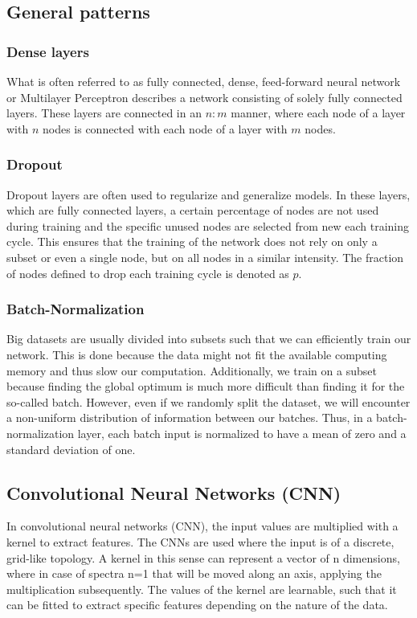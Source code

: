 \subsection{General patterns}


\subsubsection{Dense layers}
What is often referred to as fully connected, dense, feed-forward neural network or Multilayer Perceptron describes a network consisting of solely fully connected layers. These layers are connected in an $n:m$ manner, where each node of a layer with $n$ nodes is connected with each node of a layer with $m$ nodes. 

\subsubsection{Dropout}
Dropout layers are often used to regularize and generalize models. In these layers, which are fully connected layers, a certain percentage of nodes are not used during training and the specific unused nodes are selected from new each training cycle. This ensures that the training of the network does not rely on only a subset or even a single node, but on all nodes in a similar intensity. The fraction of nodes defined to drop each training cycle is denoted as $p$.

\subsubsection{Batch-Normalization}
Big datasets are usually divided into subsets such that we can efficiently train our network. This is done because the data might not fit the available computing memory and thus slow our computation. Additionally, we train on a subset because finding the global optimum is much more difficult than finding it for the so-called batch. However, even if we randomly split the dataset, we will encounter a non-uniform distribution of information between our batches. Thus, in a batch-normalization layer, each batch input is normalized to have a mean of zero and a standard deviation of one. 

\subsection{Convolutional Neural Networks (CNN)}
In convolutional neural networks (CNN), the input values are multiplied with a kernel to extract features. The CNNs are used where the input is of a discrete, grid-like topology. A kernel in this sense can represent a vector of n dimensions, where in case of spectra n=1 that will be moved along an axis, applying the multiplication subsequently. The values of the kernel are learnable, such that it can be fitted to extract specific features depending on the nature of the data.

